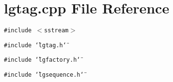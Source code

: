 \section{lgtag.cpp File Reference}
\label{lgtag_8cpp}
{\tt \#include $<$sstream$>$}\par
{\tt \#include \char`\"{}lgtag.h\char`\"{}}\par
{\tt \#include \char`\"{}lgfactory.h\char`\"{}}\par
{\tt \#include \char`\"{}lgsequence.h\char`\"{}}\par
